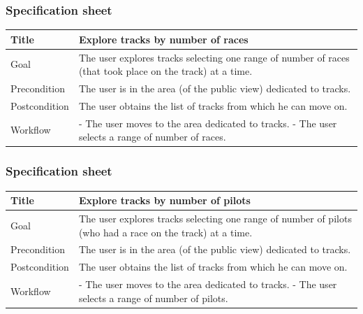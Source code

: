 \documentclass{beamer}
\begin{document}
\begin{frame}
    \frametitle{Specification sheet}
    \begin{table}
        \tiny
        \begin{tabular}{|p{2cm}|p{6cm}|}
        \hline
        Title & \textbf{Explore tracks by number of races} \\
        \hline
        Goal & The user explores tracks selecting one range of number of races
        (that took place on the track) at a time. \\ 
        \hline
        Precondition & The user is in the area (of the public view) dedicated to tracks.\\
        \hline
        Postcondition & The user obtains the list of tracks from which he can move on.\\
        \hline
        Workflow &
        - The user moves to the area dedicated to tracks. \newline
        - The user selects a range of number of races. \\
        \hline
        \end{tabular}
\end{table}
\end{frame}

\begin{frame}
    \frametitle{Specification sheet}
    \begin{table}
        \tiny
        \begin{tabular}{|p{2cm}|p{6cm}|}
        \hline
        Title & \textbf{Explore tracks by number of pilots} \\
        \hline
        Goal & The user explores tracks selecting one range of number of pilots
        (who had a race on the track) at a time. \\
        \hline
        Precondition & The user is in the area (of the public view) dedicated to tracks.\\
        \hline
        Postcondition & The user obtains the list of tracks from which he can move on.\\
        \hline
        Workflow &
        - The user moves to the area dedicated to tracks. \newline
        - The user selects a range of number of pilots. \\
        \hline
        \end{tabular}
\end{table}
\end{frame}
\end{document}
